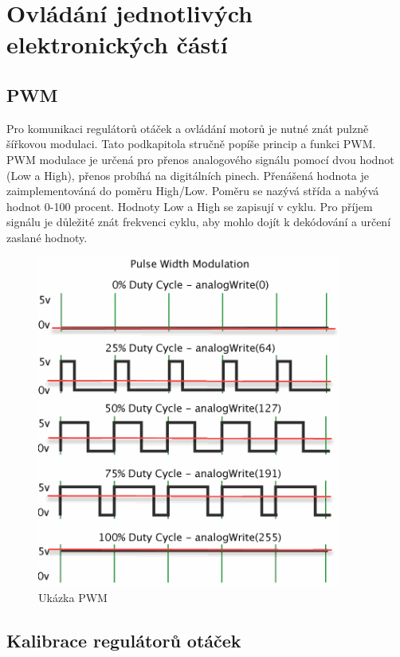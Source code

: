 \chapter{Ovládání jednotlivých elektronických částí}
\label{4-algoritmus}

\section{PWM}
Pro komunikaci regulátorů otáček a ovládání motorů je nutné znát pulzně šířkovou modulaci. Tato podkapitola stručně popíše princip  a funkci PWM.\\
PWM modulace je určená pro přenos analogového signálu pomocí dvou hodnot (Low a High), přenos probíhá na digitálních pinech. Přenášená hodnota je zaimplementováná do poměru High/Low. Poměru se nazývá střída a nabývá hodnot 0-100 procent. Hodnoty Low a High se zapisují v cyklu. Pro příjem signálu je důležité znát frekvenci cyklu, aby mohlo dojít k dekódování a určení zaslané hodnoty.

\begin{figure}[h]
	\centering
	\includegraphics[width=10cm]{pictures/pwm.png}
	\caption{Ukázka PWM}
\end{figure}


\section{Kalibrace regulátorů otáček}

